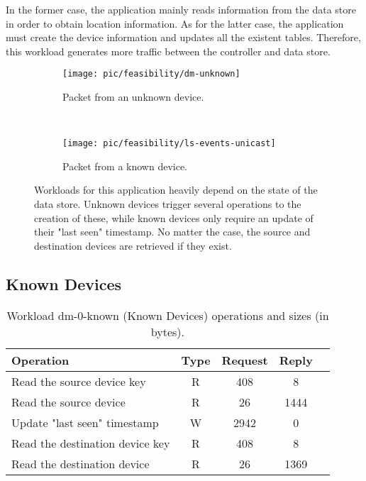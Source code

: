 In the former case, the
application mainly reads information from the data store in order to
obtain location information. As for the latter case, the
application must create the device information and updates all the
existent tables. Therefore, this workload generates more traffic between
the controller and data store. 


\begin{figure}
  \centering
  \begin{subfigure}[b]{0.5\textwidth}
                \centering
                \texttt{[image: pic/feasibility/dm-unknown]}
                \caption{Packet from an unknown device.}
                \label{fig:dm:interaction:unknown}
        \end{subfigure}%
        ~
        \begin{subfigure}[b]{0.5\textwidth}
                \centering
                \texttt{[image: pic/feasibility/ls-events-unicast]}
                \caption{Packet from a known device.}
                \label{fig:dm:interaction:known}
        \end{subfigure}
        \caption[Device Manager workload events]{Workloads for this application heavily depend on the state of the data store. Unknown devices trigger several operations to the creation of these, while known devices only require an update of their "last seen" timestamp. No matter the case, the source and destination devices are retrieved if they exist.}
        \label{fig:dm:interaction}
\end{figure}

\subsection{Known Devices}

\begin{table}[ht]
\small
\centering 
\begin{tabular}{l c c c c}
Operation & Type & Request & Reply \\ \toprule 
Read the source device key & R & 408 & 8\\
Read the source device & R & 26 & 1444\\
Update "last seen" timestamp & W & 2942 & 0\\
Read the destination device key & R & 408 & 8\\
Read the destination device & R & 26 & 1369 \\
\end{tabular}
\caption[Workload dm-0-known (Known Devices) operations]{Workload
  dm-0-known (Known Devices) operations and sizes (in bytes).}
\label{table:ops:dm-0-known}
\end{table}

